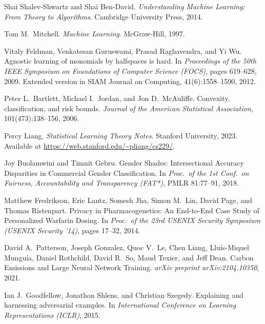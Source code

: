 \documentclass[11pt]{article}
\theoremstyle{plain} %
\begin{document}
\begin{thebibliography}{99}

Shai Shalev-Shwartz and Shai Ben-David.
\newblock \emph{Understanding Machine Learning: From Theory to Algorithms}.
\newblock Cambridge University Press, 2014.

Tom M.~Mitchell.
\newblock \emph{Machine Learning}.
\newblock McGraw-Hill, 1997.

Vitaly Feldman, Venkatesan Guruswami, Prasad Raghavendra, and Yi Wu.
\newblock Agnostic learning of monomials by halfspaces is hard.
\newblock In \emph{Proceedings of the 50th IEEE Symposium on Foundations of
  Computer Science (FOCS)}, pages 619–628, 2009.
\newblock Extended version in SIAM Journal on Computing, 41(6):1558–1590, 2012.

Peter L.~Bartlett, Michael I.~Jordan, and Jon D.~McAuliffe.
\newblock Convexity, classification, and risk bounds.
\newblock \emph{Journal of the American Statistical Association},
  101(473):138–156, 2006.

Percy Liang.
\newblock \emph{Statistical Learning Theory Notes}.
\newblock Stanford University, 2023.
\newblock Available at \url{https://web.stanford.edu/~pliang/cs229/}.

Joy Buolamwini and Timnit Gebru.
\newblock Gender Shades: Intersectional Accuracy Disparities in Commercial Gender Classification.
\newblock In \emph{Proc.\ of the 1st Conf.\ on Fairness, Accountability and Transparency (FAT*)}, PMLR 81:77–91, 2018.

Matthew Fredrikson, Eric Lantz, Somesh Jha, Simon M.~Lin, David Page, and Thomas Ristenpart.
\newblock Privacy in Pharmacogenetics: An End‐to‐End Case Study of Personalized Warfarin Dosing.
\newblock In \emph{Proc.\ of the 23rd USENIX Security Symposium (USENIX Security ’14)}, pages 17–32, 2014.

David A.~Patterson, Joseph Gonzalez, Quoc V.~Le, Chen Liang, Lluís-Miquel Munguía, Daniel Rothchild, David R.~So, Maud Texier, and Jeff Dean.
\newblock Carbon Emissions and Large Neural Network Training.
\newblock \emph{arXiv preprint arXiv:2104.10350}, 2021.


Ian J.~Goodfellow, Jonathon Shlens, and Christian Szegedy.
\newblock Explaining and harnessing adversarial examples.
\newblock In \emph{International Conference on Learning Representations (ICLR)}, 2015.


\end{thebibliography}
\end{document}
